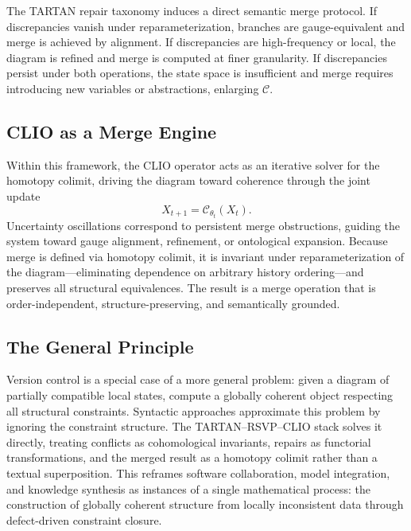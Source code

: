 \documentclass[12pt, oneside]{article}
\begin{document}
The TARTAN repair taxonomy induces a direct semantic merge protocol. If discrepancies vanish under reparameterization, branches are gauge-equivalent and merge is achieved by alignment. If discrepancies are high-frequency or local, the diagram is refined and merge is computed at finer granularity. If discrepancies persist under both operations, the state space is insufficient and merge requires introducing new variables or abstractions, enlarging $\mathcal{C}$.

\subsection{CLIO as a Merge Engine}

Within this framework, the CLIO operator \cite{cheng2025clio} acts as an iterative solver for the homotopy colimit, driving the diagram toward coherence through the joint update
\[
X_{t+1} = \mathcal{C}_{\theta_t}(X_t).
\]
Uncertainty oscillations correspond to persistent merge obstructions, guiding the system toward gauge alignment, refinement, or ontological expansion. Because merge is defined via homotopy colimit, it is invariant under reparameterization of the diagram---eliminating dependence on arbitrary history ordering---and preserves all structural equivalences. The result is a merge operation that is order-independent, structure-preserving, and semantically grounded.

\subsection{The General Principle}

Version control is a special case of a more general problem: given a diagram of partially compatible local states, compute a globally coherent object respecting all structural constraints. Syntactic approaches approximate this problem by ignoring the constraint structure. The TARTAN--RSVP--CLIO stack solves it directly, treating conflicts as cohomological invariants, repairs as functorial transformations, and the merged result as a homotopy colimit rather than a textual superposition. This reframes software collaboration, model integration, and knowledge synthesis as instances of a single mathematical process: the construction of globally coherent structure from locally inconsistent data through defect-driven constraint closure.
\end{document}
